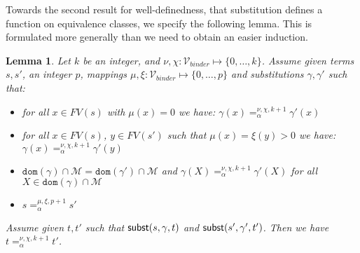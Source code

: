 \documentclass{lmcs}
\theoremstyle{theorem}\newtheorem{theorem}{Theorem}
\theoremstyle{theorem}\newtheorem{lemma}[theorem]{Lemma}
\theoremstyle{theorem}\newtheorem{corollary}[theorem]{Corollary}
\theoremstyle{definition}\newtheorem{definition}[theorem]{Definition}
\theoremstyle{definition}\newtheorem{example}[theorem]{Example}
\newcommand{\M}{\mathcal{M}}
\newcommand{\Vbound}{\mathcal{V}_{\mathit{binder}}}
\newcommand{\FV}{\mathit{FV}}
\newcommand{\domain}{\mathtt{dom}}
\newcommand{\Avar}{X}
\begin{document}
Towards the second result for well-definedness, that substitution defines a
function on equivalence classes, we specify the following lemma.  This is
formulated more generally than we need to obtain an easier induction.

\begin{lemma}\label{lem:substitutionalpha}
Let $k$ be an integer, and $\nu,\chi : \Vbound \mapsto \{0,\dots,k\}$.
Assume given terms $s,s'$, an integer $p$, mappings $\mu,\xi : \Vbound \mapsto
\{0,\dots,p\}$ and substitutions $\gamma,\gamma'$ such that:
\begin{itemize}
\item for all $x \in \FV(s)$ with $\mu(x) = 0$ we have:
  $\gamma(x) =_\alpha^{\nu,\chi,k+1} \gamma'(x)$
\item for all $x \in \FV(s)$, $y \in \FV(s')$ such that $\mu(x) = \xi(y) > 0$
  we have: $\gamma(x) =_\alpha^{\nu,\chi,k+1} \gamma'(y)$
\item $\domain(\gamma) \cap \M = \domain(\gamma') \cap \M$ and
  $\gamma(\Avar) =_\alpha^{\nu,\chi,k+1} \gamma'(\Avar)$ for all
  $\Avar \in \domain(\gamma) \cap \M$
\item $s =_\alpha^{\mu,\xi,p+1} s'$
\end{itemize}
Assume given $t,t'$ such that $\mathsf{subst}(s,\gamma,t)$ and $\mathsf{subst}(s',\gamma',
t')$.  Then we have $t =_\alpha^{\nu,\chi,k+1} t'$.
\end{lemma}
\end{document}
